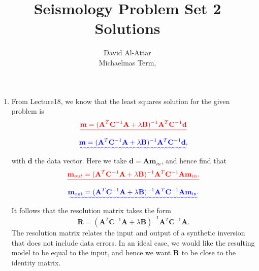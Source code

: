 \documentclass[a4paper,10pt]{paper}
\title{Seismology Problem Set 2 \DIFdelbegin \DIFdel{- }\DIFdelend \DIFaddbegin \DIFadd{-- }\DIFaddend Solutions}
\author{David Al-Attar \\ Michaelmas Term, \the\year}
\providecommand{\DIFadd}[1]{{\protect\color{blue}\uwave{#1}}} %
\providecommand{\DIFdel}[1]{{\protect\color{red}\sout{#1}}}                      %
\providecommand{\DIFaddbegin}{} %
\providecommand{\DIFaddend}{} %
\providecommand{\DIFdelbegin}{} %
\providecommand{\DIFdelend}{} %
\begin{document}
\maketitle

\begin{enumerate}
\item From Lecture\DIFaddbegin \DIFadd{~}\DIFaddend 18, we know that the least squares solution for the given problem is
\DIFdelbegin \begin{displaymath}
    \DIFdel{\mathbf{m}=(\mathbf{A}^{T}\mathbf{C}^{-1}\mathbf{A}+\lambda \mathbf{B})^{-1}\mathbf{A}^{T}\mathbf{C}^{-1}\mathbf{d}
}\end{displaymath}%
\DIFdelend \DIFaddbegin \begin{equation*}
    \DIFadd{\mathbf{m}=(\mathbf{A}^{T}\mathbf{C}^{-1}\mathbf{A}+\lambda \mathbf{B})^{-1}\mathbf{A}^{T}\mathbf{C}^{-1}\mathbf{d},
}\end{equation*}\DIFaddend 
with $\mathbf{d}$ the data vector. Here we take \DIFdelbegin \DIFdel{$\mathbf{d}=\mathbf{A}\mathbf{m}_{in}$}\DIFdelend \DIFaddbegin \DIFadd{$\mathbf{d}=\mathbf{A}\mathbf{m}_{\mathrm{in}}$}\DIFaddend , and hence find that
\DIFdelbegin \begin{displaymath}
    \DIFdel{\mathbf{m}_{out}=(\mathbf{A}^{T}\mathbf{C}^{-1}\mathbf{A}+\lambda \mathbf{B})^{-1}\mathbf{A}^{T}\mathbf{C}^{-1}\mathbf{A}\mathbf{m}_{in}.
}\end{displaymath}%
\DIFdelend \DIFaddbegin \begin{equation*}
    \DIFadd{\mathbf{m}_{\mathrm{out}}=(\mathbf{A}^{T}\mathbf{C}^{-1}\mathbf{A}+\lambda \mathbf{B})^{-1}\mathbf{A}^{T}\mathbf{C}^{-1}\mathbf{A}\mathbf{m}_{\mathrm{in}}.
}\end{equation*}\DIFaddend 
It follows that the resolution matrix takes the form
\begin{equation*}
    \mathbf{R}=(\mathbf{A}^{T}\mathbf{C}^{-1}\mathbf{A}+\lambda \mathbf{B})^{-1}\mathbf{A}^{T}\mathbf{C}^{-1}\mathbf{A}.
\end{equation*}
The resolution matrix relates the input and output of a synthetic inversion that does not include data errors. In an ideal case, we would like the resulting model to be equal to the input, and hence we want $\mathbf{R}$ to be close to the identity matrix.


\end{enumerate}
\end{document}
